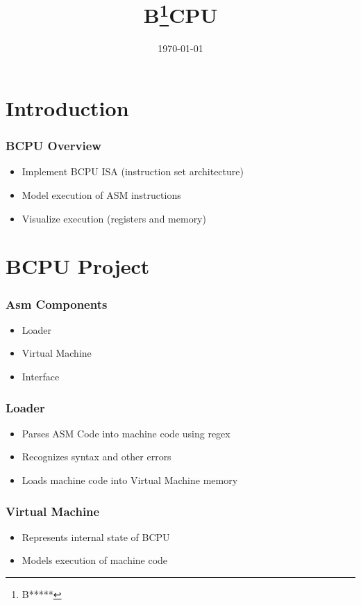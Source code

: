 

\title[Louisiana Tech University]{B\footnote{B*****}CPU}
\date{\today}


\section{Introduction}
\frame{\maketitle}

\begin{frame}
    \frametitle{BCPU Overview}
    \begin{itemize}
	\item Implement BCPU ISA (instruction set architecture)
	\item Model execution of ASM instructions
	\item Visualize execution (registers and memory)
    \end{itemize}
\end{frame}

\section{BCPU Project}

\begin{frame}
	\frametitle{Asm Components}
	\begin{itemize}
	\item Loader
	\item Virtual Machine
	\item Interface
	\end{itemize}
\end{frame}

\begin{frame}
	\frametitle{Loader}
	\begin{itemize}
	\item Parses ASM Code into machine code using regex
	\item Recognizes syntax and other errors
	\item Loads machine code into Virtual Machine memory
	\end{itemize}
\end{frame}

\begin{frame}
	\frametitle{Virtual Machine}
	\begin{itemize}
	\item Represents internal state of BCPU
	\item Models execution of machine code
	\end{itemize}
\end{frame}

